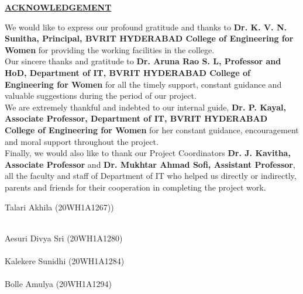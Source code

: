 \documentclass[12pt, English]{article}
\begin{document}
\begin{titlepage}
\begin{center}
\textbf{\normalsize \underline{ACKNOWLEDGEMENT}}\\
\end{center}
\vspace*{0.2in}
\begin{normalsize}
We would like to express our profound gratitude and thanks to \textbf{Dr. K. V. N. Sunitha, Principal,
BVRIT HYDERABAD College of Engineering for Women} for providing the working facilities in the
college.\\
\newline
Our sincere thanks and gratitude to \textbf{Dr. Aruna Rao S. L, Professor and HoD, Department of IT,
BVRIT HYDERABAD College of Engineering for Women} for all the timely support, constant guidance
and valuable suggestions during the period of our project.\\
\newline
We are extremely thankful and indebted to our internal guide, \textbf{Dr. P. Kayal, Associate
Professor, Department of IT, BVRIT HYDERABAD College of Engineering for Women} for her constant
guidance, encouragement and moral support throughout the project.\\
\newline
Finally, we would also like to thank our Project Coordinators \textbf{Dr. J. Kavitha, Associate Professor} and \textbf{Dr. Mukhtar Ahmad Sofi, Assistant Professor}, all the faculty and staff of Department of IT who helped us
directly or indirectly, parents and friends for their cooperation in completing the project work.
\end{normalsize}

\raggedleft
\vspace*{0.5in}
\begin{normalsize}
{Talari Akhila (20WH1A1267))}\\ \\
\vspace*{0.25in}
\raggedleft

{Aesuri Divya Sri (20WH1A1280)}\\ \\
\vspace*{0.25in}
\raggedleft
{Kalekere Sunidhi (20WH1A1284)}\\\\
\vspace*{0.25in}
\raggedleft
{Bolle Amulya (20WH1A1294)}\\ \\
\raggedleft
\end{normalsize}
\end{titlepage}
\end{document}
